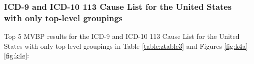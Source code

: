 \documentclass[10pt, a4paper, twocolumn]{IEEEconf}
\begin{document}
% 
% 
% 
% 
% 

\subsubsection{ICD-9 and ICD-10 113 Cause List for the United States with only top-level groupings}

Top 5 MVBP results for the ICD-9 and ICD-10 113 Cause List for the United States with only top-level groupings in Table \ref{table:ztable3} and Figures \ref{fig:k4a}-\ref{fig:k4e}:
\end{document}
